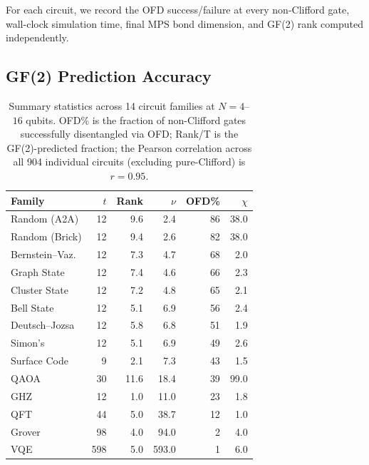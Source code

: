 \documentclass[a4paper,twocolumn,11pt]{quantumarticle}
\begin{document}
For each circuit, we record the OFD success/failure at every non-Clifford gate, wall-clock simulation time, final MPS bond dimension, and GF(2) rank computed independently.

\subsection{GF(2) Prediction Accuracy}

\begin{table}[t]
\centering
\small
\caption{Summary statistics across 14 circuit families at $N = 4$--$16$ qubits.
OFD\% is the fraction of non-Clifford gates successfully disentangled via OFD; Rank/T is the GF(2)-predicted fraction; the Pearson correlation across all 904 individual circuits (excluding pure-Clifford) is $r = 0.95$.}
\label{tab:ofd_rates}
\begin{tabular}{@{}lrrrrr@{}}
\toprule
Family & $t$ & Rank & $\nu$ & OFD\% & $\chi$ \\
\midrule
Random (A2A) & 12 & 9.6 & 2.4 & 86 & 38.0 \\
Random (Brick) & 12 & 9.4 & 2.6 & 82 & 38.0 \\
Bernstein--Vaz. & 12 & 7.3 & 4.7 & 68 & 2.0 \\
Graph State & 12 & 7.4 & 4.6 & 66 & 2.3 \\
Cluster State & 12 & 7.2 & 4.8 & 65 & 2.1 \\
Bell State & 12 & 5.1 & 6.9 & 56 & 2.4 \\
Deutsch--Jozsa & 12 & 5.8 & 6.8 & 51 & 1.9 \\
Simon's & 12 & 5.1 & 6.9 & 49 & 2.6 \\
Surface Code & 9 & 2.1 & 7.3 & 43 & 1.5 \\
QAOA & 30 & 11.6 & 18.4 & 39 & 99.0 \\
GHZ & 12 & 1.0 & 11.0 & 23 & 1.8 \\
QFT & 44 & 5.0 & 38.7 & 12 & 1.0 \\
Grover & 98 & 4.0 & 94.0 & 2 & 4.0 \\
VQE & 598 & 5.0 & 593.0 & 1 & 6.0 \\
\bottomrule
\end{tabular}
\vspace{1mm}


\end{table}
\end{document}
